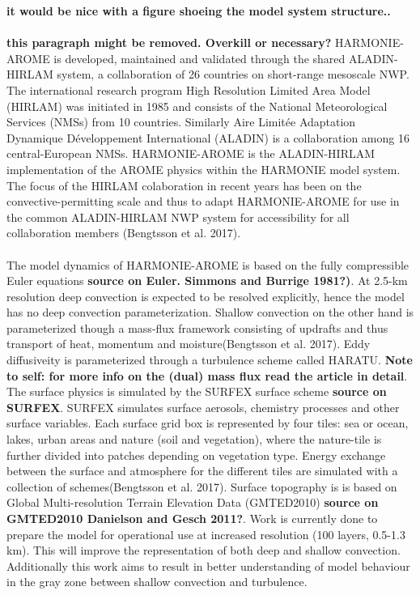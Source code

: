 \textbf{it would be nice with a figure shoeing the model system structure..}
\\
\\
\textbf{this paragraph might be removed. Overkill or necessary?}
HARMONIE-AROME is developed, maintained and validated through the shared ALADIN-HIRLAM system, a collaboration of 26 countries on short-range mesoscale NWP. The international research program High Resolution Limited Area Model (HIRLAM) was initiated in 1985 and consists of the National Meteorological Services (NMSs) from 10 countries. Similarly Aire Limitée Adaptation Dynamique Développement International (ALADIN) is a collaboration among 16 central-European NMSs. HARMONIE-AROME is the ALADIN-HIRLAM implementation of the AROME physics within the HARMONIE model system. The focus of the HIRLAM colaboration in recent years has been on the convective-permitting scale and thus to adapt HARMONIE-AROME for use in the common ALADIN-HIRLAM NWP system for accessibility for all collaboration members (Bengtsson et al. 2017)\cite{bengtsson_arome}.
\\
\\
The model dynamics of HARMONIE-AROME is based on the fully compressible Euler equations \textbf{source on Euler. Simmons and Burrige 1981?)}. At 2.5-km resolution deep convection is expected to be resolved explicitly, hence the model has no deep convection parameterization. Shallow convection on the other hand is parameterized though a mass-flux framework consisting of updrafts and thus transport of heat, momentum and moisture(Bengtsson et al. 2017)\cite{bengtsson_arome}. Eddy diffusiveity is parameterized through a turbulence scheme called HARATU. \textbf{Note to self: for more info on the (dual) mass flux read the article in detail}. The surface physics is simulated by the SURFEX surface scheme \textbf{source on SURFEX}. SURFEX simulates surface aerosols, chemistry processes and other surface variables. Each surface grid box is represented by four tiles: sea or ocean, lakes, urban areas and nature (soil and vegetation), where the nature-tile is further divided into patches depending on vegetation type. Energy exchange between the surface and atmosphere for the different tiles are simulated with a collection of schemes(Bengtsson et al. 2017)\cite{bengtsson_arome}. Surface topography is is based on Global Multi-resolution Terrain Elevation Data (GMTED2010) \textbf{source on GMTED2010 Danielson and Gesch 2011?}. Work is currently done to prepare the model for operational use at increased resolution (100 layers, 0.5-1.3 km). This will improve the representation of both deep and shallow convection. Additionally this work aims to result in better understanding of model behaviour in the gray zone between shallow convection and turbulence.
\\
\\

